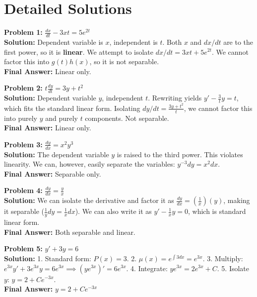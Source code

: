 \documentclass[11pt]{article}
\begin{document}
\section{Detailed Solutions}

\textbf{Problem 1:} $\frac{dx}{dt} - 3xt = 5e^{2t}$ \\
\textbf{Solution:} Dependent variable is $x$, independent is $t$. Both $x$ and $dx/dt$ are to the first power, so it is \textbf{linear}. We attempt to isolate $dx/dt = 3xt + 5e^{2t}$. We cannot factor this into $g(t)h(x)$, so it is not separable. \\
\textbf{Final Answer:} Linear only.

\vspace{10pt}
\textbf{Problem 2:} $t \frac{dy}{dt} = 3y + t^2$ \\
\textbf{Solution:} Dependent variable $y$, independent $t$. Rewriting yields $y' - \frac{3}{t}y = t$, which fits the standard linear form. Isolating $dy/dt = \frac{3y+t^2}{t}$, we cannot factor this into purely $y$ and purely $t$ components. Not separable. \\
\textbf{Final Answer:} Linear only.

\vspace{10pt}
\textbf{Problem 3:} $\frac{dy}{dx} = x^2 y^3$ \\
\textbf{Solution:} The dependent variable $y$ is raised to the third power. This violates linearity. We can, however, easily separate the variables: $y^{-3} dy = x^2 dx$. \\
\textbf{Final Answer:} Separable only.

\vspace{10pt}
\textbf{Problem 4:} $\frac{dy}{dx} = \frac{y}{x}$ \\
\textbf{Solution:} We can isolate the derivative and factor it as $\frac{dy}{dx} = (\frac{1}{x})(y)$, making it separable ($\frac{1}{y}dy = \frac{1}{x}dx$). We can also write it as $y' - \frac{1}{x}y = 0$, which is standard linear form. \\
\textbf{Final Answer:} Both separable and linear.

\vspace{10pt}
\textbf{Problem 5:} $y' + 3y = 6$ \\
\textbf{Solution:} 
1. Standard form: $P(x) = 3$. 
2. $\mu(x) = e^{\int 3 dx} = e^{3x}$. 
3. Multiply: $e^{3x}y' + 3e^{3x}y = 6e^{3x} \implies (ye^{3x})' = 6e^{3x}$. 
4. Integrate: $ye^{3x} = 2e^{3x} + C$.
5. Isolate $y$: $y = 2 + Ce^{-3x}$. \\
\textbf{Final Answer:} $y = 2 + Ce^{-3x}$
\end{document}
